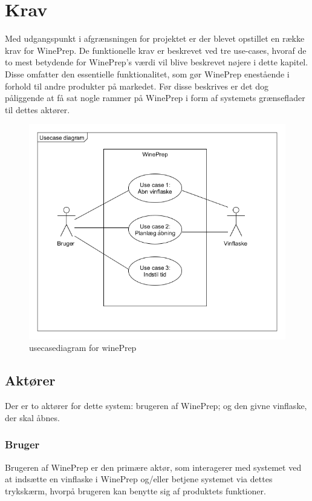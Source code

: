 \chapter{Krav}
Med udgangspunkt i afgrænsningen for projektet er der blevet opstillet en række krav for WinePrep. De funktionelle krav er beskrevet ved tre use-cases, 
hvoraf de to mest betydende for WinePrep's værdi vil blive beskrevet nøjere i dette kapitel. Disse omfatter den essentielle funktionalitet, som gør WinePrep 
enestående i forhold til andre produkter på markedet. Før disse beskrives er det dog påliggende at få sat nogle rammer på WinePrep i form af systemets 
grænseflader til dettes aktører.

\begin{figure}[H]
	\centerline{\includegraphics[scale=0.5]{Usecasediagram}}
	\caption{usecasediagram for winePrep}
\end{figure}

\section{Aktører}
Der er to aktører for dette system: brugeren af WinePrep; og den givne vinflaske, der skal åbnes.

\subsection{Bruger}
Brugeren af WinePrep er den primære aktør, som interagerer med systemet ved at indsætte en vinflaske i WinePrep og/eller betjene systemet via dettes trykskærm, 
hvorpå brugeren kan benytte sig af produktets funktioner.

